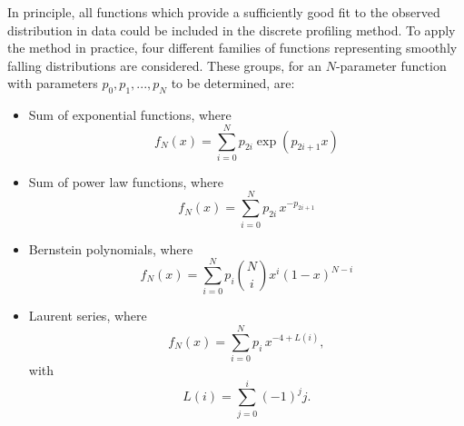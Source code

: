 In principle, all functions which provide a sufficiently good fit to the observed \mgg distribution
in data could be included in the discrete profiling method.
To apply the method in practice, 
four different families of functions representing smoothly falling distributions are considered.
These groups, 
for an $N$-parameter function with parameters $p_0, p_1, ..., p_N$ to be determined, are: 
\begin{itemize}
\item Sum of exponential functions, where
\begin{equation*}
f_N(x) = \sum_{i=0}^{N} p_{2i}\exp{\left(p_{2i+1}x\right)}
\end{equation*}
\item Sum of power law functions, where
\begin{equation*}
f_N(x) = \sum_{i=0}^{N} p_{2i}\,x^{-p_{2i+1}}
\end{equation*}
\item Bernstein polynomials, where
\begin{equation*}
f_N(x) = \sum_{i=0}^{N} p_{i}\binom{N}{i}x^{i}\left(1-x\right)^{N-i}
\end{equation*}
\item Laurent series, where
\begin{equation*}
f_N(x) = \sum_{i=0}^{N} p_{i}\,x^{-4 + L(i)},
\end{equation*}
with
\begin{equation*}
L(i) = \sum_{j=0}^{i}(-1)^j j .
\end{equation*}
\end{itemize}

